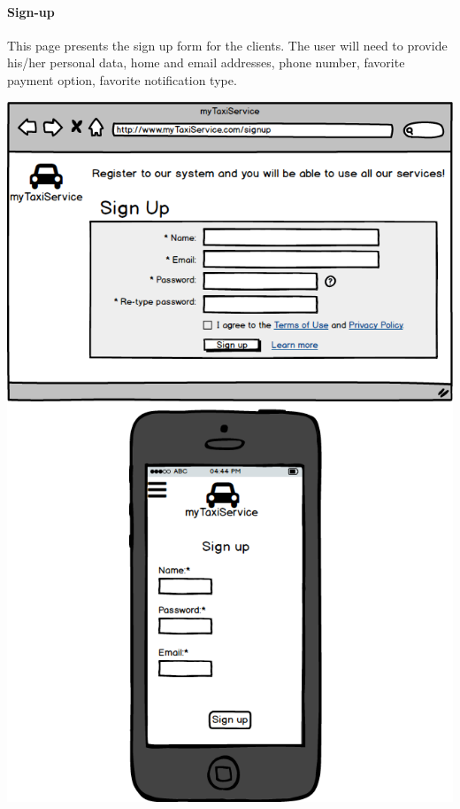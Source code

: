 \documentclass[a4paper,11pt]{report} %
\begin{document}
	\pagebreak
	\paragraph{Sign-up} This page presents the sign up form for the clients. The user will need to provide his/her personal data, home and email addresses, phone number, favorite payment option, favorite notification type.
	\begin{center}
		\includegraphics[width=0.9\linewidth]{Pictures/Signup}
	\end{center}
	\pagebreak
	
\end{document}
